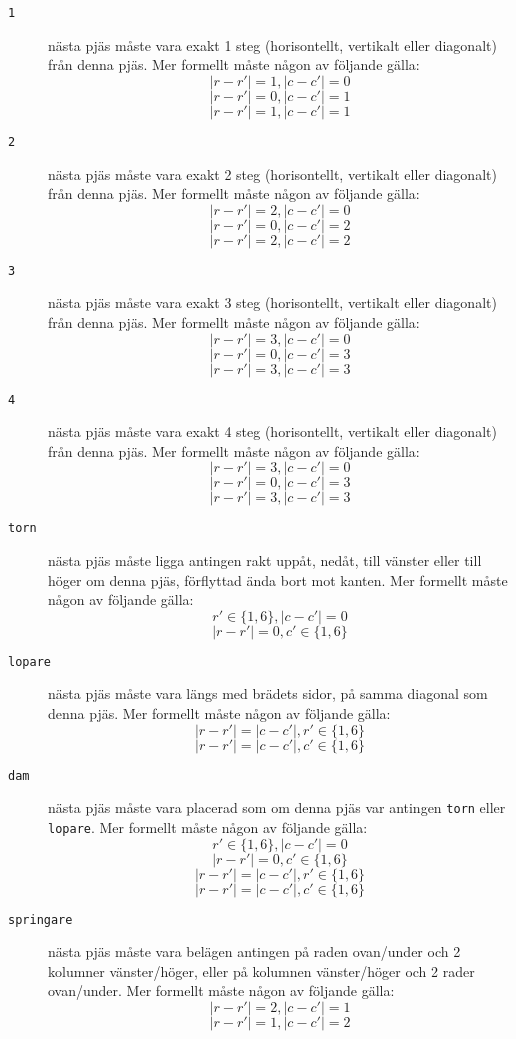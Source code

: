 \begin{description}
  \item[\texttt{1}] nästa pjäs måste vara exakt 1 steg (horisontellt, vertikalt eller diagonalt) från denna pjäs.
    Mer formellt måste någon av följande gälla:
    $$|r - r'| = 1, |c - c'| = 0$$
    $$|r - r'| = 0, |c - c'| = 1$$
    $$|r - r'| = 1, |c - c'| = 1$$

  \item[\texttt{2}] nästa pjäs måste vara exakt 2 steg (horisontellt, vertikalt eller diagonalt) från denna pjäs.
    Mer formellt måste någon av följande gälla:
    $$|r - r'| = 2, |c - c'| = 0$$
    $$|r - r'| = 0, |c - c'| = 2$$
    $$|r - r'| = 2, |c - c'| = 2$$

  \item[\texttt{3}] nästa pjäs måste vara exakt 3 steg (horisontellt, vertikalt eller diagonalt) från denna pjäs.
    Mer formellt måste någon av följande gälla:
    $$|r - r'| = 3, |c - c'| = 0$$
    $$|r - r'| = 0, |c - c'| = 3$$
    $$|r - r'| = 3, |c - c'| = 3$$

  \item[\texttt{4}] nästa pjäs måste vara exakt 4 steg (horisontellt, vertikalt eller diagonalt) från denna pjäs.
    Mer formellt måste någon av följande gälla:
    $$|r - r'| = 3, |c - c'| = 0$$
    $$|r - r'| = 0, |c - c'| = 3$$
    $$|r - r'| = 3, |c - c'| = 3$$

  \item[\texttt{torn}] nästa pjäs måste ligga antingen rakt
    uppåt, nedåt, till vänster eller till höger om denna pjäs, förflyttad ända bort mot kanten.
    Mer formellt måste någon av följande gälla:
    $$r' \in \{1, 6\}, |c - c'| = 0$$
    $$|r - r'| = 0, c' \in \{1, 6\}$$

  \item[\texttt{lopare}] nästa pjäs måste vara längs med brädets sidor, på samma diagonal som denna pjäs.
    Mer formellt måste någon av följande gälla:
    $$|r - r'| = |c - c'|, r' \in \{1, 6\}$$
    $$|r - r'| = |c - c'|, c' \in \{1, 6\}$$

  \item[\texttt{dam}] nästa pjäs måste vara placerad som om denna pjäs var antingen \texttt{torn} eller \texttt{lopare}.
    Mer formellt måste någon av följande gälla:
    $$r' \in \{1, 6\}, |c - c'| = 0$$
    $$|r - r'| = 0, c' \in \{1, 6\}$$
    $$|r - r'| = |c - c'|, r' \in \{1, 6\}$$
    $$|r - r'| = |c - c'|, c' \in \{1, 6\}$$

  \item[\texttt{springare}] nästa pjäs måste vara belägen antingen på raden ovan/under och 2 kolumner vänster/höger, eller
    på kolumnen vänster/höger och 2 rader ovan/under.
    Mer formellt måste någon av följande gälla:
    $$|r - r'| = 2, |c - c'| = 1$$
    $$|r - r'| = 1, |c - c'| = 2$$
\end{description}

